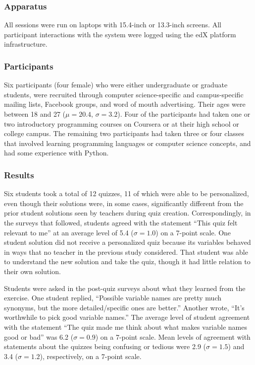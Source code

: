 \subsubsection{Apparatus}

All sessions were run on laptops with 15.4-inch or 13.3-inch screens. All participant interactions with the system were logged using the edX platform infrastructure.

\subsubsection{Participants}

Six participants (four female) who were either undergraduate or graduate students, were recruited through computer science-specific and campus-specific mailing lists, Facebook groups, and word of mouth advertising. Their ages were between 18 and 27 ($\mu=20.4$, $\sigma=3.2$). Four of the participants had taken one or two introductory programming courses on Coursera or at their high school or college campus. The remaining two participants had taken three or four classes that involved learning programming languages or computer science concepts, and had some experience with Python.

\subsubsection{Results}
Six students took a total of 12 quizzes, 11 of which were able to be personalized, even though their solutions were, in some cases, significantly different from the prior student solutions seen by teachers during quiz creation. Correspondingly, in the surveys that followed, students agreed with the statement ``This quiz felt relevant to me'' at an average level of 5.4 ($\sigma = 1.0$) on a 7-point scale. One student solution did not receive a personalized quiz because its variables behaved in ways that no teacher in the previous study considered. That student was able to understand the new solution and take the quiz, though it had little relation to their own solution.

Students were asked in the post-quiz surveys about what they learned from the exercise. One student replied, ``Possible variable names are pretty much synonyms, but the more detailed/specific ones are better.'' Another wrote, ``It's worthwhile to pick good variable names.'' The average level of student agreement with the statement ``The quiz made me think about what makes variable names good or bad'' was 6.2 ($\sigma = 0.9$) on a 7-point scale. Mean levels of agreement with statements about the quizzes being confusing or tedious were 2.9 ($\sigma = 1.5$) and 3.4 ($\sigma = 1.2$), respectively, on a 7-point scale.


